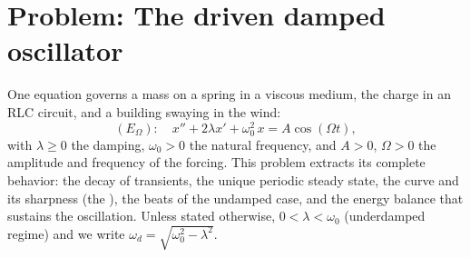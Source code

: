\section{Problem: The driven damped oscillator}

\begin{problem}\label{pb:b1:diffeq:1}
One equation governs a mass on a spring in a viscous medium, the
charge in an RLC circuit, and a building swaying in the wind:
\[
(E_\Omega)\colon\quad
x'' + 2\lambda x' + \omega_0^2\,x = A\cos(\Omega t),
\]
with $\lambda \geq 0$ the damping, $\omega_0 > 0$ the natural
frequency, and $A > 0$, $\Omega > 0$ the amplitude and frequency of
the forcing. This problem extracts its complete behavior: the decay
of transients, the unique periodic steady state, the 
curve and its sharpness (the \emph{}), the beats of
the undamped case, and the energy balance that sustains the
oscillation.
Unless stated otherwise, $0 < \lambda < \omega_0$ (underdamped
regime) and we write $\omega_d = \sqrt{\omega_0^2 - \lambda^2}$.


\end{problem}
